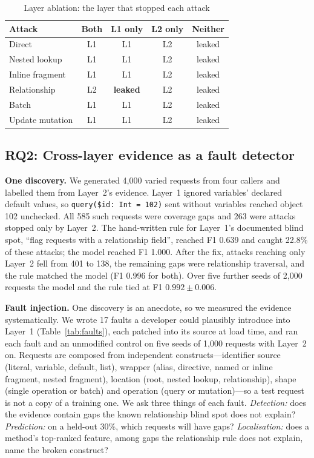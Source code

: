 \documentclass[conference]{IEEEtran}
\newcommand{\code}[1]{\texttt{\small #1}}
\begin{document}
\begin{table}[t]
\caption{Layer ablation: the layer that stopped each attack}
\label{tab:ablation}
\centering
\footnotesize
\begin{tabular}{@{}lcccc@{}}
\toprule
Attack & Both & L1 only & L2 only & Neither \\
\midrule
Direct & L1 & L1 & L2 & leaked \\
Nested lookup & L1 & L1 & L2 & leaked \\
Inline fragment & L1 & L1 & L2 & leaked \\
Relationship & L2 & \textbf{leaked} & L2 & leaked \\
Batch & L1 & L1 & L2 & leaked \\
Update mutation & L1 & L1 & L2 & leaked \\
\bottomrule
\end{tabular}
\end{table}

\subsection{RQ2: Cross-layer evidence as a fault detector}\label{sec:faults}

\textbf{One discovery.} We generated 4,000 varied requests from four callers and labelled them from Layer~2's evidence. Layer~1 ignored variables' declared default values, so \code{query(\$id: Int = 102)} sent without variables reached object 102 unchecked. All 585 such requests were coverage gaps and 263 were attacks stopped only by Layer~2. The hand-written rule for Layer~1's documented blind spot, ``flag requests with a relationship field'', reached F1 0.639 and caught 22.8\% of these attacks; the model reached F1 1.000. After the fix, attacks reaching only Layer~2 fell from 401 to 138, the remaining gaps were relationship traversal, and the rule matched the model (F1 0.996 for both). Over five further seeds of 2,000 requests the model and the rule tied at F1 $0.992\pm0.006$.

\textbf{Fault injection.} One discovery is an anecdote, so we measured the evidence systematically. We wrote 17 faults a developer could plausibly introduce into Layer~1 (Table~\ref{tab:faults}), each patched into its source at load time, and ran each fault and an unmodified control on five seeds of 1,000 requests with Layer~2 on. Requests are composed from independent constructs---identifier source (literal, variable, default, list), wrapper (alias, directive, named or inline fragment, nested fragment), location (root, nested lookup, relationship), shape (single operation or batch) and operation (query or mutation)---so a test request is not a copy of a training one. We ask three things of each fault. \emph{Detection:} does the evidence contain gaps the known relationship blind spot does not explain? \emph{Prediction:} on a held-out 30\%, which requests will have gaps? \emph{Localisation:} does a method's top-ranked feature, among gaps the relationship rule does not explain, name the broken construct?
\end{document}
